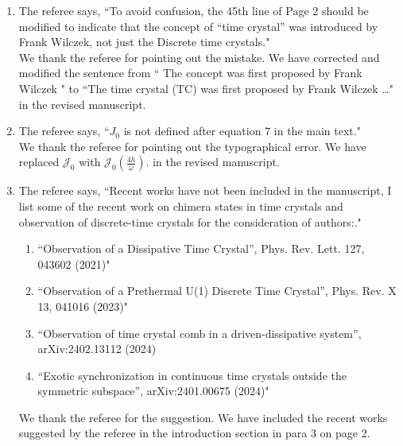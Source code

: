 \documentclass[aps,prb,reprint,showpacs,floatfix,superscriptaddress, onecolumn, nofootinbib, 10pt]{revtex4-2}
\newcommand{\response}[1]{{\color{black}#1}} %
\newcommand{\comment}[1]{{\color{blue}#1}} %
\begin{document}
\begin{enumerate}
\begin{enumerate}
		\item The referee says, \comment{``To avoid confusion, the 45th line of Page 2 should be modified to indicate that the concept of “time crystal” was introduced by Frank Wilczek, not just the Discrete time crystals."}\\
		
		\response{We thank the referee for pointing out the mistake. We have corrected and modified the sentence from `` The concept was
		first proposed by Frank Wilczek " to ``The time crystal (TC) was first proposed by Frank Wilczek \dots" in the revised manuscript.}
	
		\item The referee says, \comment{``$J_0$ is not defined after equation 7 in the main text."}\\
		
		\response{We thank the referee for pointing out the typographical error. We have replaced $\mathcal{J}_0$ with $\mathcal{J}_0\left(\frac{4h}{\omega}\right)$. in the revised manuscript.}
		
		\item The referee says, \comment{``Recent works have not been included in the manuscript, I list some of the recent work on chimera states in time crystals and observation of discrete-time crystals for the consideration of authors:."}
		\begin{enumerate}
			\item \comment{``Observation of a Dissipative Time Crystal”, Phys. Rev. Lett. 127, 043602 (2021)"}
			\item \comment{``Observation of a Prethermal U(1) Discrete Time Crystal”, Phys. Rev. X 13, 041016 (2023)"}
			\item \comment{``Observation of time crystal comb in a driven-dissipative system”, arXiv:2402.13112 (2024)}
			\item \comment{``Exotic synchronization in continuous time crystals outside the symmetric subspace”, arXiv:2401.00675 (2024)"}\\
		\end{enumerate}
		
		\response{
		We thank the referee for the suggestion. We have included the recent works suggested by the referee in the introduction section in para 3 on page 2. 
		}\\
	\end{enumerate}
\end{enumerate}
		
\end{document}
